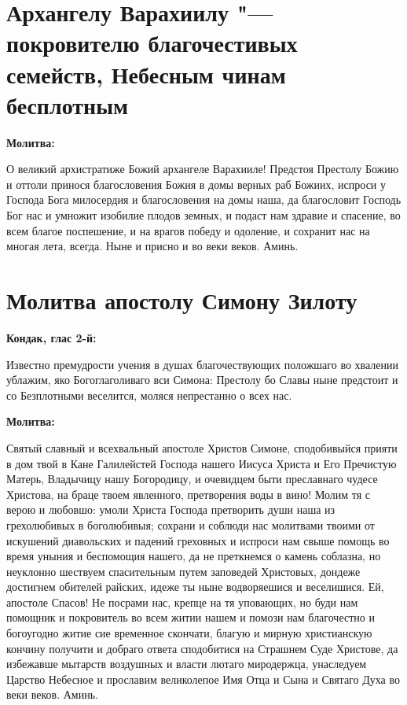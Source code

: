 {\bigskip\bigskip\noparindent\begin{minipage}{\textwidth}
\section{Архангелу Варахиилу "--- покровителю благочестивых семейств, Небесным чинам бесплотным}

\restoreparindent\bfseries Молитва:\normalfont{}\par

О великий архистратиже Божий архангеле Варахииле! Предстоя Престолу Божию и оттоли принося благословения Божия в домы верных раб Божиих, испроси у Господа Бога милосердия и благословения на домы наша, да благословит Господь Бог нас и умножит изобилие плодов земных, и подаст нам здравие и спасение, во всем благое поспешение, и на врагов победу и одоление, и сохранит нас на многая лета, всегда. Ныне и присно и во веки веков. Аминь.
\end{minipage}}

\section{Молитва апостолу Симону Зилоту}
 
\bfseries Кондак, глас 2-й:\normalfont{}


Известно премудрости учения в душах благочествующих положшаго во хвалении ублажим, яко Богоглаголиваго вси Симона: Престолу бо Славы ныне предстоит и со Безплотными веселится, моляся непрестанно о всех нас.


\medskip
\bfseries Молитва:\normalfont{}


Святый славный и всехвальный апостоле Христов Симоне, сподобивыйся прияти в дом твой в Кане Галилейстей Господа нашего Иисуса Христа и Его Пречистую Матерь, Владычицу нашу Богородицу, и очевидцем быти преславнаго чудесе Христова, на браце твоем явленного, претворения воды в вино! Молим тя с верою и любовшо: умоли Христа Господа претворить души наша из грехолюбивых в боголюбивыя; сохрани и соблюди нас молитвами твоими от искушений диавольских и падений греховных и испроси нам свыше помощь во время уныния и беспомощия нашего, да не преткнемся о камень соблазна, но неуклонно шествуем спасительным путем заповедей Христовых, дондеже достигнем обителей райских, идеже ты ныне водворяешися и веселишися. Ей, апостоле Спасов! Не посрами нас, крепце на тя уповающих, но буди нам помощник и покровитель во всем житии нашем и помози нам благочестно и богоугодно житие сие временное скончати, благую и мирную христианскую кончину получити и добраго ответа сподобитися на Страшнем Суде Христове, да избежавше мытарств воздушных и власти лютаго миродержца, унаследуем Царство Небесное и прославим великолепое Имя Отца и Сына и Святаго Духа во веки веков. Аминь.

